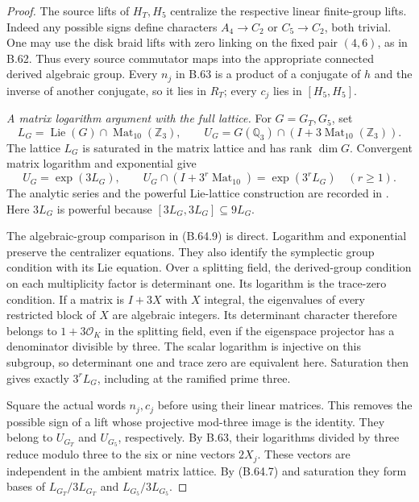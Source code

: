 \begin{proof}
The source lifts of $H_T,H_5$ centralize the respective
linear finite-group lifts.
Indeed any possible signs define characters
$A_4\to C_2$ or $C_5\to C_2$, both trivial.
One may use the disk braid lifts with zero linking on
the fixed pair $(4,6)$, as in B.62.
Thus every source commutator maps into the appropriate
connected derived algebraic group.
Every $n_j$ in B.63 is a product of a conjugate of $h$
and the inverse of another conjugate, so it lies in
$R_T$; every $c_j$ lies in $[H_5,H_5]$.

\emph{A matrix logarithm argument with the full lattice.}
For $G=G_T,G_5$, set
\[
 L_G=\operatorname{Lie}(G)\cap
                         \operatorname{Mat}_{10}(\mathbb Z_3),
 \qquad
 U_G=G(\mathbb Q_3)\cap
                         (I+3\operatorname{Mat}_{10}(\mathbb Z_3)).
                                                               \tag{B.64.8}
\]
The lattice $L_G$ is saturated in the matrix lattice
and has rank $\dim G$.
Convergent matrix logarithm and exponential give
\[
                U_G=\exp(3L_G),\qquad
                U_G\cap(I+3^r\operatorname{Mat}_{10})
                         =\exp(3^rL_G)\quad(r\geq1).        \tag{B.64.9}
\]
The analytic series and the powerful Lie-lattice
construction are recorded in
\citet[Proposition 6.22 and Theorem 9.8]{DE_DixonEtAl1999}.
Here $3L_G$ is powerful because
$[3L_G,3L_G]\subseteq9L_G$.

The algebraic-group comparison in (B.64.9) is direct.
Logarithm and exponential preserve the centralizer
equations.  They also identify the symplectic group
condition with its Lie equation.
Over a splitting field, the derived-group condition
on each multiplicity factor is determinant one.
Its logarithm is the trace-zero condition.
If a matrix is $I+3X$ with $X$ integral, the eigenvalues
of every restricted block of $X$ are algebraic integers.
Its determinant character therefore belongs to
$1+3\mathcal O_K$ in the splitting field, even if the
eigenspace projector has a denominator divisible by three.
The scalar logarithm is injective on this subgroup,
so determinant one and trace zero are equivalent here.
Saturation then gives exactly $3^rL_G$, including at
the ramified prime three.

Square the actual words $n_j,c_j$ before using their
linear matrices.  This removes the possible sign of
a lift whose projective mod-three image is the identity.
They belong to $U_{G_T}$ and $U_{G_5}$, respectively.
By B.63, their logarithms divided by three reduce
modulo three to the six or nine vectors $2X_j$.
These vectors are independent in the ambient matrix
lattice.  By (B.64.7) and saturation they form bases
of $L_{G_T}/3L_{G_T}$ and $L_{G_5}/3L_{G_5}$.


\end{proof}
